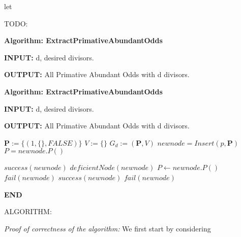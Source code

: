 \documentclass[../paper.tex]{subfiles}
\begin{document}
let 

\begin {algorithmic}
\STATE TODO: 

\end {algorithmic}
{\setlength{\parindent}{0cm}

\textbf{Algorithm: ExtractPrimativeAbundantOdds}

\textbf{INPUT:} d, desired divisors.

\textbf{OUTPUT:} All Primative Abundant Odds with d divisors.

}


{\setlength{\parindent}{0cm}

\textbf{Algorithm: ExtractPrimativeAbundantOdds}

\textbf{INPUT:} d, desired divisors.

\textbf{OUTPUT:} All Primative Abundant Odds with d divisors.

}

\begin{algorithmic}

\STATE $\mathbf{P} := \{(1, \{\}, FALSE)\}$
\STATE $V := \{\}$
\STATE $G_d := (\mathbf{P},V)$
	\STATE $newnode = Insert(p,\mathbf{P})$ 
	\STATE $P = newnode.P()$
	\STATE


			\STATE $success(newnode)$
		\ELSE
			\STATE $deficientNode(newnode)$
			\STATE $P \leftarrow newnode.P()$
		\ENDIF
	\ENDIF
			\STATE $fail(newnode)$
		\ENDIF
			\STATE $success(newnode)$
		\ELSE
			\STATE $fail(newnode)$
		\ENDIF
	\ENDIF

\ENDWHILE
%
\end{algorithmic}

\textbf{END}


ALGORITHM:



\textit{Proof of correctness of the algorithm:}
We first start by considering 
\end{document}
